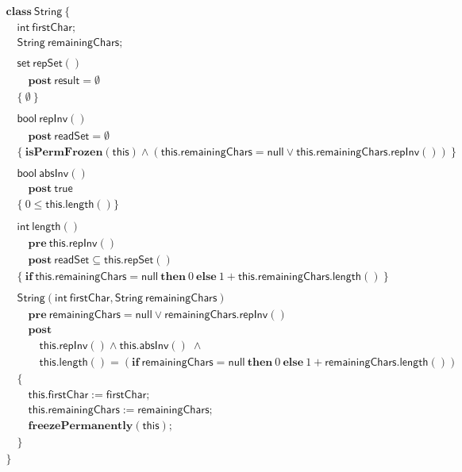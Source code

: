 \documentclass{article}
\begin{document}
$$\begin{array}{l}
\mathbf{class}\ \mathsf{String}\ \{\\
\quad \mathsf{int}\ \mathsf{firstChar};\\
\quad \mathsf{String}\ \mathsf{remainingChars};\\
\\
\quad \mathsf{set}\ \mathsf{repSet}()\\
\quad\quad \mathbf{post}\ \mathsf{result} = \emptyset\\
\quad \{\ \emptyset\ \}\\
\\
\quad \mathsf{bool}\ \mathsf{repInv}()\\
\quad\quad \mathbf{post}\ \mathsf{readSet} = \emptyset\\
\quad \{\ \mathbf{isPermFrozen}(\mathsf{this}) \land (\mathsf{this}.\mathsf{remainingChars} = \mathsf{null} \lor \mathsf{this}.\mathsf{remainingChars}.\mathsf{repInv}())\ \}\\
\\
\quad \mathsf{bool}\ \mathsf{absInv}()\\
\quad\quad \mathbf{post}\ \mathsf{true}\\
\quad \{\ 0 \le \mathsf{this}.\mathsf{length}() \}\\
\\
\quad \mathsf{int}\ \mathsf{length}()\\
\quad\quad \mathbf{pre}\ \mathsf{this}.\mathsf{repInv}()\\
\quad\quad \mathbf{post}\ \mathsf{readSet} \subseteq \mathsf{this}.\mathsf{repSet}()\\
\quad \{\ \mathbf{if}\ \mathsf{this}.\mathsf{remainingChars} = \mathsf{null}\ \mathbf{then}\ 0\ \mathbf{else}\ 1 + \mathsf{this}.\mathsf{remainingChars}.\mathsf{length}()\ \}\\
\\
\quad \mathsf{String}(\mathsf{int}\ \mathsf{firstChar}, \mathsf{String}\ \mathsf{remainingChars})\\
\quad\quad \mathbf{pre}\ \mathsf{remainingChars} = \mathsf{null} \lor \mathsf{remainingChars}.\mathsf{repInv}()\\
\quad\quad \mathbf{post}\\
\quad\quad\quad \mathsf{this}.\mathsf{repInv}() \land \mathsf{this}.\mathsf{absInv}()\; \land\\
\quad\quad\quad \mathsf{this}.\mathsf{length}() = (\mathbf{if}\ \mathsf{remainingChars} = \mathsf{null}\ \mathbf{then}\ 0\ \mathbf{else}\ 1 + \mathsf{remainingChars}.\mathsf{length}())\\
\quad \{\\
\quad\quad \mathsf{this}.\mathsf{firstChar} := \mathsf{firstChar};\\
\quad\quad \mathsf{this}.\mathsf{remainingChars} := \mathsf{remainingChars};\\
\quad\quad \mathbf{freezePermanently}(\mathsf{this});\\
\quad \}\\
\}
\end{array}$$
\end{document}
